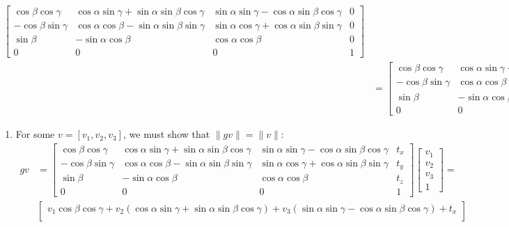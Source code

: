 \documentclass[12pt]{article}
\begin{document}
\begin{enumerate}
\begin{align*}
\begin{bmatrix}
	\cos\beta \cos\gamma & \cos\alpha \sin\gamma+ \sin\alpha \sin\beta \cos\gamma & \sin\alpha \sin\gamma - \cos\alpha \sin\beta \cos\gamma & 0 \\
	-\cos\beta \sin\gamma & \cos\alpha \cos\beta - \sin\alpha \sin\beta \sin\gamma & \sin\alpha \cos\gamma + \cos\alpha \sin\beta \sin\gamma & 0 \\
	\sin\beta & -\sin\alpha \cos\beta & \cos\alpha\cos\beta & 0 \\
	0 & 0 & 0 & 1 \end{bmatrix} \\
	&= \begin{bmatrix} \cos\beta \cos\gamma & \cos\alpha \sin\gamma+ \sin\alpha \sin\beta \cos\gamma & \sin\alpha \sin\gamma - \cos\alpha \sin\beta \cos\gamma & t_x \\
	-\cos\beta \sin\gamma & \cos\alpha \cos\beta - \sin\alpha \sin\beta \sin\gamma & \sin\alpha \cos\gamma + \cos\alpha \sin\beta \sin\gamma & t_y \\
	\sin\beta & -\sin\alpha \cos\beta & \cos\alpha\cos\beta & t_z \\
	0 & 0 & 0 & 1 \end{bmatrix}
	\end{align*}
	\begin{enumerate}
		\item For some $v = [v_1, v_2, v_3]$, we must show that $\|gv\| = \|v\|$:
		\begin{align*}
		gv &= \begin{bmatrix} \cos\beta \cos\gamma & \cos\alpha \sin\gamma + \sin\alpha \sin\beta \cos\gamma & \sin\alpha \sin\gamma - \cos\alpha \sin\beta \cos\gamma & t_x \\
		-\cos\beta \sin\gamma & \cos\alpha \cos\beta - \sin\alpha \sin\beta \sin\gamma & \sin\alpha \cos\gamma + \cos\alpha \sin\beta \sin\gamma & t_y \\
		\sin\beta & -\sin\alpha \cos\beta & \cos\alpha\cos\beta & t_z \\
		0 & 0 & 0 & 1 \end{bmatrix} \begin{bmatrix} v_1 \\ v_2 \\ v_3 \\ 1 \end{bmatrix} = \\
		&\begin{bmatrix}
		v_1\cos\beta\cos\gamma + v_2 (\cos\alpha \sin\gamma + \sin\alpha \sin\beta \cos\gamma)  + v_3 (\sin\alpha \sin\gamma - \cos\alpha \sin\beta \cos\gamma) + t_x \\

\end{bmatrix}
\end{align*}
\end{enumerate}
\end{enumerate}
\end{document}
